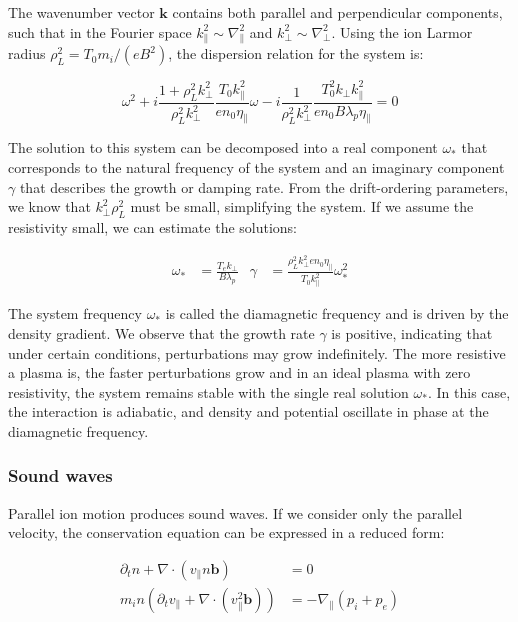 The wavenumber vector $ \mathbf{k} $ contains both parallel and perpendicular components, such that in the Fourier space $ k_\parallel^2 \sim \nabla_\parallel^2 $ and $ k_\perp^2 \sim \nabla_\perp^2 $. Using the ion Larmor radius $\rho_L^2 = T_0m_i/(eB^2)$, the dispersion relation for the system is: 

\begin{equation}
	\omega^2 + i\frac{1 + \rho_L^2k_\perp^2}{\rho_L^2k_\perp^2}\frac{T_0k_\parallel^2}{en_0\eta_\parallel}\omega - i\frac{1}{\rho_L^2k_\perp^2}\frac{T_0^2k_\perp k_\parallel^2}{en_0B\lambda_p\eta_\parallel} = 0
\end{equation}


The solution to this system can be decomposed into a real component $ \omega_* $ that corresponds to the natural frequency of the system and an imaginary component $ \gamma $ that describes the growth or damping rate. From the drift-ordering parameters, we know that $ k_\perp^2 \rho_L^2 $ must be small, simplifying the system. If we assume the resistivity small, we can estimate the solutions:

\begin{align}
	\omega_* &= \frac{T_e k_\perp}{B\lambda_p} & \gamma &= \frac{\rho_L^2k_\perp^2en_0\eta_\parallel}{T_0k_\parallel^2}\omega_*^2
\end{align}

The system frequency $ \omega_* $ is called the diamagnetic frequency and is driven by the density gradient. We observe that the growth rate $ \gamma $ is positive, indicating that under certain conditions, perturbations may grow indefinitely. The more resistive a plasma is, the faster perturbations grow and in an ideal plasma with zero resistivity, the system remains stable with the single real solution $\omega_*$. In this case, the interaction is adiabatic, and density and potential oscillate in phase at the diamagnetic frequency.


\subsubsection{Sound waves}

Parallel ion motion produces sound waves. If we consider only the parallel velocity, the conservation equation can be expressed in a reduced form:

\begin{align}
	\partial_t n + \nabla \cdot (v_\parallel n\mathbf{b}) &= 0 \\
	m_i n \left(\partial_t v_\parallel + \nabla \cdot \left(v_\parallel^2 \mathbf{b}\right)\right) &= -\nabla_\parallel (p_i + p_e)
\end{align}

